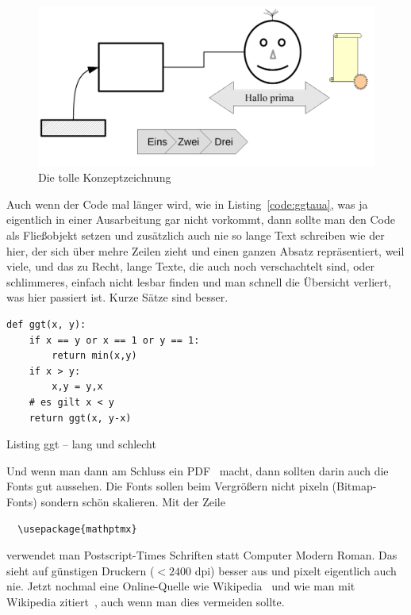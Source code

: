 \documentclass[11pt,a4paper]{article} %
\begin{document}
\begin{figure}[htp]
\centering
\includegraphics[width=.9\textwidth]{zeichnung.pdf}
\caption{Die tolle Konzeptzeichnung}
\label{fig:tk}
\end{figure}

Auch wenn der Code mal länger wird, wie in Listing~\ref{code:ggtaua}, 
was ja eigentlich in einer Ausarbeitung gar nicht vorkommt, 
dann sollte man den Code als Fließobjekt setzen und 
zusätzlich auch nie so lange Text schreiben wie der hier, der sich 
über mehre Zeilen zieht und einen ganzen Absatz repräsentiert, 
weil viele, und das zu Recht, lange Texte, die auch noch verschachtelt sind,
oder schlimmeres, einfach nicht lesbar finden und man schnell
die Übersicht verliert, was hier passiert ist.
Kurze Sätze sind besser. 

\begin{listing}[ht]
\begin{lstlisting}
def ggt(x, y):
    if x == y or x == 1 or y == 1:
        return min(x,y)
    if x > y:
        x,y = y,x
    # es gilt x < y
    return ggt(x, y-x)
\end{lstlisting}
\caption{Listing ggt -- lang und schlecht}
\label{code:ggtaua}
\end{listing}

Und wenn man dann am Schluss ein PDF~\cite{pdf} macht, dann
sollten darin auch die Fonts gut aussehen. 
Die Fonts sollen beim Vergrößern nicht pixeln (Bitmap-Fonts) sondern
schön skalieren. 
Mit der Zeile 
\begin{verbatim}
  \usepackage{mathptmx}
\end{verbatim}
verwendet man Postscript-Times Schriften statt
\newcommand{\cmr}{\fontsize{11}{14}\selectfont}
{\cmr Computer Modern Roman}.
Das sieht auf günstigen Druckern ($< 2400$ dpi) besser aus und
pixelt eigentlich auch nie.
Jetzt nochmal eine Online-Quelle wie Wikipedia~\cite{wikipedia} 
und wie man mit Wikipedia zitiert~\cite{wikipedia,wikipediaciting},
auch wenn man dies vermeiden sollte.
\end{document}
